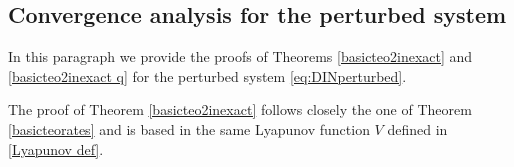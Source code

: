 \documentclass[reqno]{amsart}
\theoremstyle{plain}
\theoremstyle{definition}
\theoremstyle{remark}
\DeclarePairedDelimiter{\norm}{\lVert}{\rVert}	%
\newcommand{\VA}{\VAcomment}
\begin{document}
%	
%	

\subsection{Convergence analysis for the perturbed system}
In this paragraph we provide the proofs of Theorems \ref{basicteo2inexact} and \ref{basicteo2inexact q} for the perturbed system \eqref{eq:DINperturbed}. 

The proof of Theorem \ref{basicteo2inexact} follows closely the one of Theorem \ref{basicteorates} and is based in the same Lyapunov function $V$ defined in \eqref{Lyapunov def}. 
\end{document}
